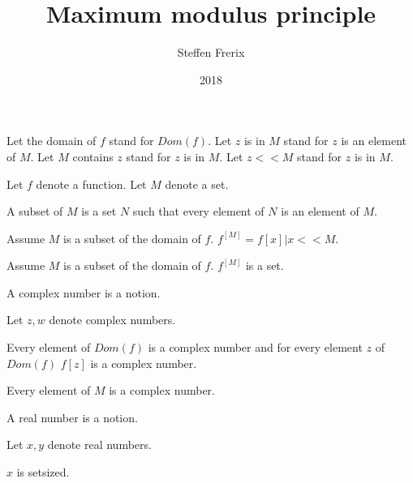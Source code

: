 \documentclass{article}
\title{Maximum modulus principle}
\author{Steffen Frerix}
\date{2018}
\begin{document}

  \maketitle

  \begin{forthel}

    Let the domain of $f$ stand for $Dom(f)$.
    Let $z$ is in $M$ stand for $z$ is an element of $M$.
    Let $M$ contains $z$ stand for $z$ is in $M$.
    Let $z << M$ stand for $z$ is in $M$.

    Let $f$ denote a function.
    Let $M$ denote a set.

    \begin{definition}
      A subset of $M$ is a set $N$ such that every element of $N$ is an element of $M$.
    \end{definition}

    \begin{definition}
      Assume $M$ is a subset of the domain of $f$. $f^[M] = { f[x] | x << M }$.
    \end{definition}

    \begin{axiom}
      Assume $M$ is a subset of the domain of $f$. $f^[M]$ is a set.
    \end{axiom}

    \begin{signature}
      A complex number is a notion.
    \end{signature}

    Let $z,w$ denote complex numbers.

    \begin{axiom}
      Every element of $Dom(f)$ is a complex number and for every element $z$ of $Dom(f)$ $f[z]$ is a complex number.
    \end{axiom}

    \begin{axiom}
      Every element of $M$ is a complex number.
    \end{axiom}

    \begin{signature}
      A real number is a notion.
    \end{signature}

    Let $x,y$ denote real numbers.

    \begin{axiom}
      $x$ is setsized.
    \end{axiom}


\end{forthel}
\end{document}
